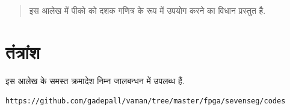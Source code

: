\documentclass[journal,12pt,twocolumn]{IEEEtran}
\begin{document}



%

\begin{abstract}
इस आलेख में  पीको  को  दशक गणित्र के रूप में उपयोग करने का विधान प्रस्तुत है.


\end{abstract}

\printnomenclature[1.7in]

\section{तंत्रांश}
इस आलेख के समस्त क्रमादेश निम्न जालबन्धन में उपलब्ध हैं.
\begin{lstlisting}
https://github.com/gadepall/vaman/tree/master/fpga/sevenseg/codes
\end{lstlisting}
%
\end{document}
